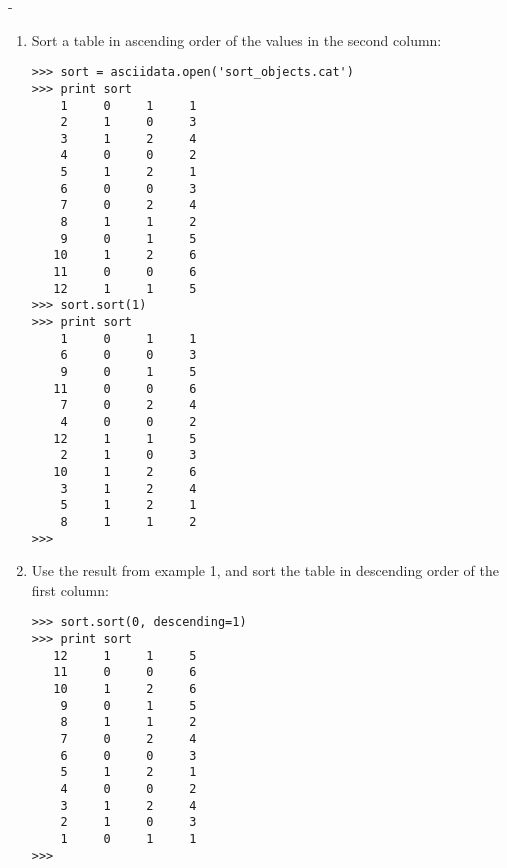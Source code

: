-

\begin{enumerate}
\item Sort a table in ascending order of the values in the second column:
\begin{small}
\begin{verbatim}
>>> sort = asciidata.open('sort_objects.cat')
>>> print sort
    1     0     1     1
    2     1     0     3
    3     1     2     4
    4     0     0     2
    5     1     2     1
    6     0     0     3
    7     0     2     4
    8     1     1     2
    9     0     1     5
   10     1     2     6
   11     0     0     6
   12     1     1     5
>>> sort.sort(1)
>>> print sort
    1     0     1     1
    6     0     0     3
    9     0     1     5
   11     0     0     6
    7     0     2     4
    4     0     0     2
   12     1     1     5
    2     1     0     3
   10     1     2     6
    3     1     2     4
    5     1     2     1
    8     1     1     2
>>>
\end{verbatim}
\end{small}

\item Use the result from example 1, and sort the table in descending
order of the first column:
\begin{small}
\begin{verbatim}
>>> sort.sort(0, descending=1)
>>> print sort
   12     1     1     5
   11     0     0     6
   10     1     2     6
    9     0     1     5
    8     1     1     2
    7     0     2     4
    6     0     0     3
    5     1     2     1
    4     0     0     2
    3     1     2     4
    2     1     0     3
    1     0     1     1
>>>
\end{verbatim}
\end{small}


\end{enumerate}
